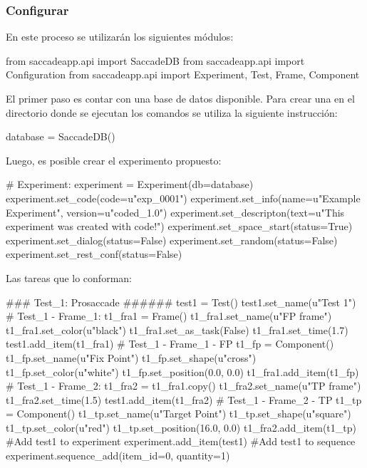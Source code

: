 \documentclass[\main/Main.tex]{subfiles}
\begin{document}
            \subsubsection{Configurar}
                En este proceso se utilizarán los siguientes módulos:
\begin{singlespace}\begin{python}
from saccadeapp.api import SaccadeDB
from saccadeapp.api import Configuration
from saccadeapp.api import Experiment, Test, Frame, Component
\end{python}\end{singlespace}

                El primer paso es contar con una base de datos disponible. Para crear una en el directorio donde se ejecutan los comandos se utiliza la siguiente instrucción: 
\begin{singlespace}\begin{python}
database = SaccadeDB()
\end{python}\end{singlespace}
        
                Luego, es posible crear el experimento propuesto:
\begin{singlespace}\begin{python}
# Experiment:
experiment = Experiment(db=database)
experiment.set_code(code=u"exp_0001")
experiment.set_info(name=u"Example Experiment", version=u"coded_1.0")
experiment.set_descripton(text=u"This experiment was created with code!")
experiment.set_space_start(status=True)
experiment.set_dialog(status=False)
experiment.set_random(status=False)
experiment.set_rest_conf(status=False)
\end{python}\end{singlespace}

                Las tareas que lo conforman:
\begin{singlespace}\begin{python}
### Test_1: Prosaccade ######
test1 = Test()
test1.set_name(u"Test 1")
# Test_1 - Frame_1: 
t1_fra1 = Frame()
t1_fra1.set_name(u"FP frame")
t1_fra1.set_color(u"black")
t1_fra1.set_as_task(False)
t1_fra1.set_time(1.7)
test1.add_item(t1_fra1)
# Test_1 - Frame_1 - FP
t1_fp = Component()
t1_fp.set_name(u"Fix Point")
t1_fp.set_shape(u"cross")
t1_fp.set_color(u"white")
t1_fp.set_position(0.0, 0.0)
t1_fra1.add_item(t1_fp)
# Test_1 - Frame_2:
t1_fra2 = t1_fra1.copy()
t1_fra2.set_name(u"TP frame")
t1_fra2.set_time(1.5)
test1.add_item(t1_fra2)
# Test_1 - Frame_2 - TP
t1_tp = Component()
t1_tp.set_name(u"Target Point")
t1_tp.set_shape(u"square")
t1_tp.set_color(u"red")
t1_tp.set_position(16.0, 0.0)
t1_fra2.add_item(t1_tp)
#Add test1 to experiment
experiment.add_item(test1)
#Add test1 to sequence
experiment.sequence_add(item_id=0, quantity=1)
\end{python}\end{singlespace}
\end{document}
